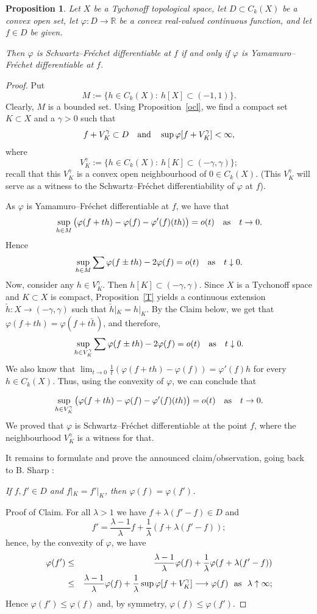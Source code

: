 \documentclass[12pt]{amsart}
\theoremstyle{plain}
\newtheorem{proposition}[theorem]{Proposition}
\theoremstyle{definition}
\theoremstyle{remark}
\def\R{{\mathbb R}}
\def\vv{\varphi}
\begin{document}
\begin{proposition}\label{SY} Let $X$ be a Tychonoff topological space, let $D\subset C_k(X)$ be a convex open set, let $\vv: D\to\R$ be a convex real-valued continuous function, and let $f\in D$ be given.

\noindent Then $\vv$ is Schwartz--Fr\'echet differentiable at $f$ if and only if $\vv$ is Yamamuro--Fr\'echet differentiable at $f$.
\end{proposition}
\begin{proof}
 Put
\begin{equation}\label{M}
M:=  \{h\in C_k(X):\ h[X]\subset (-1,1)\}.
\end{equation}
Clearly, $M$ is a bounded set. Using Proposition~\ref{ocl}, we find a compact set $K\subset X$ and a $\gamma>0$
such that
$$
f+V^\gamma_K\subset D\quad {\rm and}\quad \sup\vv [f+V^\gamma_K]<\infty,
$$
where
$$
V^\gamma_K:= \{h\in C_k(X):\ h[K] \subset (-\gamma,\gamma)\};
$$
recall that this $V^\gamma_K$ is a convex open neighbourhood of $0\in C_k(X)$. (This $V^\gamma_K$ will serve as a witness to the
Schwartz--Fr\'echet differentiability of $\vv$ at $f$).

As $\vv$ is Yamamuro--Fr\'echet differentiable at $f$, we have that
$$
\sup_{h\in M}\big(\vv(f+th)-\vv(f)-\vv'(f)(th)\big) = o(t)\quad{\rm as}\quad t\to0.
$$
Hence
$$
\sup_{h\in M}\sum\vv(f\pm th)-2\vv(f) = o(t)\quad{\rm as}\quad t\downarrow0.
$$
Now, consider any $h\in V^\gamma_K$. Then $h[K]\subset (-\gamma,\gamma)$.
Since $X$ is a Tychonoff space and $K\subset X$ is compact, Proposition~\ref{T} yields a continuous
extension $ \check h: X\to (-\gamma,\gamma)$ such that $\check h|_K=h|_K$.
By the Claim below, we get that $\vv(f+th)=\vv(f+t\check h)$, and therefore,
$$
\sup_{h\in V^\gamma_K}\sum\vv(f\pm th)-2\vv(f) = o(t)\quad{\rm as}\quad t\downarrow0.
$$
We also know that $\lim_{t\to0}\frac1t(\vv(f+th)-\vv(f))=\vv'(f)h$ for every $h\in C_k(X)$.
Thus, using the convexity of $\vv$, we can conclude that

$$\sup_{h\in V^\gamma_K}\big(\vv(f+th)-\vv(f)-\vv'(f)(th)\big) = o(t)\quad{\rm as}\quad t\to0.
$$
We proved that $\vv$ is Schwartz--Fr\'echet differentiable at the point $f$, where the neighbourhood $V^\gamma_K$ is a witness for that.

It remains to formulate and prove the announced claim/observation, going back to B. Sharp \cite[p. 208, 209]{s}:
\medskip

  {\it If $f,f'\in D$ and $f|_K=f'|_K$, then $\vv(f)=\vv(f')$.}
\smallskip

\noindent Proof of Claim.
For all $\lambda>1$ we have $f+\lambda(f'-f)\in D  $ and
$$
f'=\frac{\lambda-1}\lambda f +\frac1\lambda(f+\lambda(f'-f));
$$
hence, by the convexity of $\vv$, we have
\begin{eqnarray*}
\vv(f') &\le& \frac{\lambda-1}\lambda \vv(f) +\frac1\lambda\vv(f+\lambda(f'-f)) \\
        &\le& \frac{\lambda-1}\lambda \vv(f) +\frac1\lambda\sup\vv[f+V_K^\gamma] \longrightarrow \vv(f)\ \ {\rm as}\ \ \lambda\uparrow\infty;
\end{eqnarray*}
Hence $\vv(f') \le \vv(f)$ and, by symmetry, $\vv(f) \le \vv(f')$.
\end{proof}
\end{document}
